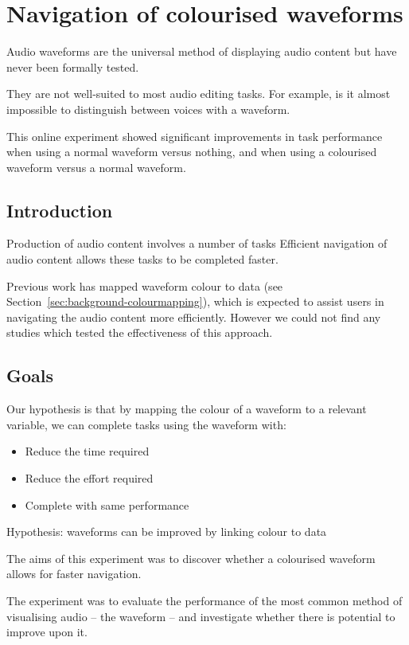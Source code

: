 \chapter{Navigation of colourised waveforms}\label{chp:colourised}

Audio waveforms are the universal method of displaying audio content but have never been formally tested.

They are not well-suited to most audio editing tasks. For example, is it almost impossible to distinguish between voices with a waveform.

This online experiment showed significant improvements in task performance when using a normal waveform versus nothing, and when using a colourised waveform versus a normal waveform.

\section{Introduction}
Production of audio content involves a number of tasks
Efficient navigation of audio content allows these tasks to be completed faster.

Previous work has mapped waveform colour to data (see Section~\ref{sec:background-colourmapping}), which is expected to
assist users in navigating the audio content more efficiently. However we could not find any studies which tested the
effectiveness of this approach.

\section{Goals}

Our hypothesis is that by mapping the colour of a waveform to a relevant variable, we can complete tasks using the
waveform with:
\begin{itemize}
  \item Reduce the time required
  \item Reduce the effort required
  \item Complete with same performance
\end{itemize}

Hypothesis: waveforms can be improved by linking colour to data

The aims of this experiment was to discover whether a colourised waveform allows for faster navigation.

The experiment was to evaluate the performance of the most common method of visualising audio -- the
waveform -- and investigate whether there is potential to improve upon it.

